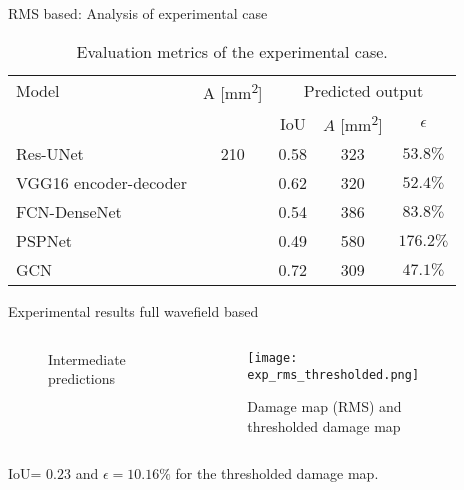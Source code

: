 \documentclass[10pt,aspectratio=169,dvipsnames]{beamer} %
\begin{document}
		\begin{frame}{RMS based: Analysis of experimental case}
			\begin{table}[!ht]
				\centering
				\caption{Evaluation metrics of the experimental case.}
				\label{tab:rms_exp_case}
				\begin{tabular}{l@{\ }cccc}
					\toprule
					\multicolumn{1}{l}{Model} & \multicolumn{1}{c}{A [mm\textsuperscript{2}]} & \multicolumn{3}{c}{Predicted output} \\ 
					\cmidrule(lr){3-5} & & \multicolumn{1}{c}{IoU} & \multicolumn{1}{c}{\(\hat{A}\) [mm\textsuperscript{2}]} & \(\epsilon\) \\ \midrule
					Res-UNet & \multicolumn{1}{c}{210} & \multicolumn{1}{c}{0.58} & \multicolumn{1}{c}{323}  & \(53.8\%\) \\ 
					VGG16 encoder-decoder &  & \multicolumn{1}{c}{0.62} & \multicolumn{1}{c}{320} & \(52.4\%\) 
					\\ 
					FCN-DenseNet &  & \multicolumn{1}{c}{0.54} & \multicolumn{1}{c}{386} & \(83.8\%\) \\ 
					PSPNet &  & \multicolumn{1}{c}{0.49} & \multicolumn{1}{c}{580} & \(176.2\%\) 
					\\ 
					GCN &  & \multicolumn{1}{c}{0.72} & \multicolumn{1}{c}{309} & \(47.1\%\) 
					\\ 
					\bottomrule
				\end{tabular}		
			\end{table}
		\end{frame}
		
		\begin{frame}{Experimental results full wavefield based}
			\begin{columns}[T]		
				\begin{column}[t]{0.32\textwidth}
					\begin{figure}
						\centering
						\caption{Intermediate predictions}
					\end{figure}
				\end{column}
				\begin{column}[t]{0.65\textwidth}
					\begin{figure}
						\centering
						\texttt{[image: exp\_rms\_thresholded.png]}
						\caption{Damage map (RMS) and thresholded damage map}
					\end{figure}
				\end{column}
			\end{columns}
			IoU= $0.23$ and $\epsilon=10.16\%$  for the thresholded damage map.
		\end{frame}
		
\end{document}
